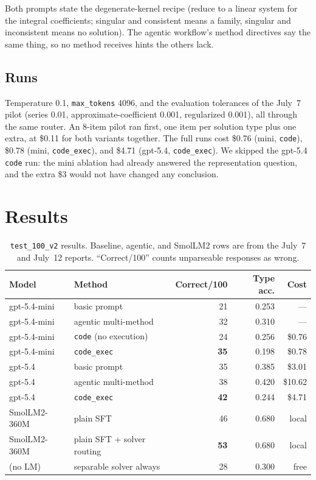 \documentclass[11pt]{article}
\begin{document}
Both prompts state the degenerate-kernel recipe (reduce to a linear system
for the integral coefficients; singular and consistent means a family,
singular and inconsistent means no solution). The agentic workflow's
method directives say the same thing, so no method receives hints the others
lack.

\subsection{Runs}
Temperature 0.1, \texttt{max\_tokens} 4096, and the evaluation tolerances of
the July~7 pilot (series 0.01, approximate-coefficient 0.001, regularized
0.001), all through the same router. An 8-item pilot ran first, one item per
solution type plus one extra, at \$0.11 for both variants together. The full
runs cost \$0.76 (mini, \texttt{code}), \$0.78 (mini, \texttt{code\_exec}),
and \$4.71 (gpt-5.4, \texttt{code\_exec}). We skipped the gpt-5.4
\texttt{code} run: the mini ablation had already answered the representation
question, and the extra \$3 would not have changed any conclusion.

\section{Results}

\begin{table}[h]
\centering
\begin{tabular}{llrrr}
\toprule
Model & Method & Correct/100 & Type acc. & Cost \\
\midrule
gpt-5.4-mini & basic prompt            & 21 & 0.253 & --- \\
gpt-5.4-mini & agentic multi-method    & 32 & 0.310 & --- \\
gpt-5.4-mini & \texttt{code} (no execution) & 24 & 0.256 & \$0.76 \\
gpt-5.4-mini & \texttt{code\_exec}     & \textbf{35} & 0.198 & \$0.78 \\
\midrule
gpt-5.4 & basic prompt                 & 35 & 0.385 & \$3.01 \\
gpt-5.4 & agentic multi-method         & 38 & 0.420 & \$10.62 \\
gpt-5.4 & \texttt{code\_exec}          & \textbf{42} & 0.244 & \$4.71 \\
\midrule
SmolLM2-360M & plain SFT               & 46 & 0.680 & local \\
SmolLM2-360M & plain SFT + solver routing & \textbf{53} & 0.680 & local \\
(no LM) & separable solver always      & 28 & 0.300 & free \\
\bottomrule
\end{tabular}
\caption{\texttt{test\_100\_v2} results. Baseline, agentic, and SmolLM2 rows
are from the July~7 and July~12 reports. ``Correct/100'' counts unparseable
responses as wrong.}
\end{table}
\end{document}
